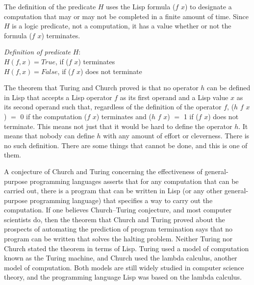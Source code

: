 The definition of the predicate $H$ uses the Lisp
formula \textsf{($f$ $x$)} to designate a computation that may
or may not be completed in a finite amount of time.
Since $H$ is a logic predicate, not a computation,
it has a value whether or not the formula \textsf{($f$ $x$)} terminates.

\label{def:predicate-H}
\hspace*{5mm}\emph{Definition of predicate} $H$:\\
\hspace*{10mm}$H(f, x) = True$, if \textsf{($f$ $x$)} terminates\\
\hspace*{10mm}$H(f, x) = False$, if \textsf{($f$ $x$)} does not terminate

The theorem that Turing and Church proved is that
no operator $h$ can be defined in Lisp
that accepts a Lisp operator $f$ as its
first operand and a Lisp value $x$ as its second operand
such that, regardless of the definition of the operator $f$,
\textsf{($h$ $f$ $x$)} $=$ 0 if the computation \textsf{($f$ $x$)} terminates and
\textsf{($h$ $f$ $x$)} $=$ 1 if \textsf{($f$ $x$)} does not terminate.
This means not just that it would be hard to define the operator $h$.
It means that nobody can define $h$ with any amount of effort or cleverness.
There is no such definition.
There are some things that cannot be done, and this is one of them.

\label{church-turing-hypothesis}A
conjecture of Church and Turing
concerning the effectiveness of general-purpose programming languages
asserts that for any computation that can be carried out, there is a program
that can be written in Lisp (or any other general-purpose programming language)
that specifies a way to carry out the computation.
If one believes Church--Turing conjecture, and most computer scientists do,
then the theorem that Church and Turing proved about the prospects of
automating the prediction of program termination
says that no program can be written that solves the halting problem.
Neither Turing nor Church stated the theorem in terms of Lisp.
Turing used a model of computation known as the Turing machine, and
Church used the lambda calculus, another model of computation.
Both models are still widely studied in computer science theory,
and the programming language Lisp
was based on the lambda calculus.

